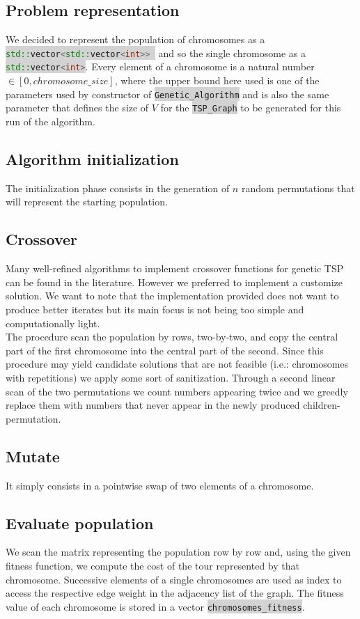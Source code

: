 \documentclass[11pt]{article}
\newcommand{\inlinecode}[2]{\colorbox{lightgray}{\lstinline[language=#1]$#2$}}
\begin{document}
\subsection{Problem representation}
We decided to represent the population of chromosomes as a
\inlinecode{C++}{std::vector<std::vector<int>> } and so the single chromosome as a \inlinecode{C++}{std::vector<int>}. Every element of a chromosome is a natural number $ \in [0, chromosome\_size] $, where the  upper bound here used is one of the parameters used by constructor of \inlinecode{C++}{Genetic_Algorithm} and is also the same parameter that defines the size of $ V $ for the \inlinecode{C++}{TSP_Graph} to be generated for this run of the algorithm.

\subsection{Algorithm initialization}
The initialization phase consists in the generation of $ n $ random permutations that will represent the starting population.

\subsection{Crossover}
Many well-refined algorithms to implement crossover functions for genetic TSP can be found in the literature. However we preferred to implement a customize solution. We want to note that the implementation provided does not want to produce better iterates but its main focus is not being too simple and computationally light.\\
The procedure scan the population by rows, two-by-two, and copy the central part of the first chromosome into the central part of the second. Since this procedure may yield candidate solutions that are not feasible (i.e.: chromosomes with repetitions) we apply some sort of sanitization. Through a second linear scan of the two permutations we count numbers appearing twice and we greedly replace them with numbers that never appear in the newly produced children-permutation.

\subsection{Mutate}
It simply consists in a pointwise swap of two elements of a chromosome.

\subsection{Evaluate population}
We scan the matrix representing the population row by row and, using the given fitness function, we compute the cost of the tour represented by that chromosome. Successive elements of a single chromosomes are used as index to access the respective edge weight in the adjacency list of the graph. The fitness value of each chromosome is stored in a vector \inlinecode{C++}{chromosomes_fitness}.
\end{document}
